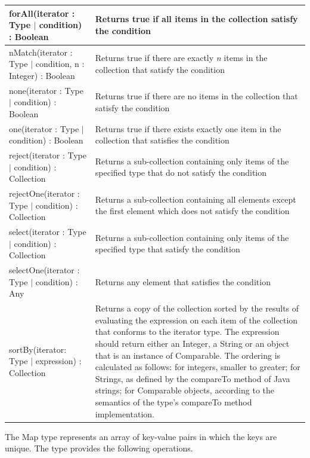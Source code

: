 \begin{longtabu} {|p{6.5cm}|X|}
    forAll(iterator : Type $|$ condition) : Boolean & Returns true if all items in the collection satisfy the condition \\\hline
    
    nMatch(iterator : Type $|$ condition, n : Integer) : Boolean & Returns true if there are exactly \emph{n} items in the collection that satisfy the condition \\\hline
    
    none(iterator : Type $|$ condition) : Boolean & Returns true if there are no items in the collection that satisfy the condition \\\hline
    
    one(iterator : Type $|$ condition) : Boolean & Returns true if there exists exactly one item in the collection that satisfies the condition \\\hline

    reject(iterator : Type $|$ condition) : Collection & Returns a sub-collection containing only items of the specified type that do not satisfy the condition \\\hline
    
    rejectOne(iterator : Type $|$ condition) : Collection & Returns a sub-collection containing all elements except the first element which does not satisfy the condition \\\hline
    
    select(iterator : Type $|$ condition) : Collection & Returns a sub-collection containing only items of the specified type that satisfy the condition \\\hline
    
    selectOne(iterator : Type $|$ condition) : Any & Returns any element that satisfies the condition \\\hline
    
    sortBy(iterator: Type $|$ expression) : Collection & Returns a copy of the collection sorted by the results of evaluating the expression on each item of the collection that conforms to the iterator type. The expression should return either an Integer, a String or an object that is an instance of Comparable. The ordering is calculated as follows: for integers, smaller to greater; for Strings, as defined by the compareTo method of Java strings; for Comparable objects, according to the semantics of the type's compareTo method implementation.  \\\hline
\end{longtabu}

The Map type represents an array of key-value pairs in which the keys are unique. The type provides the following operations.


